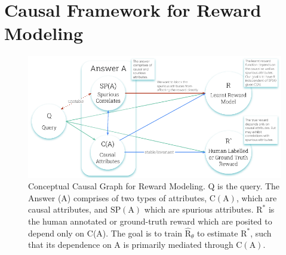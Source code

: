 
\section{Causal Framework for Reward Modeling}
\label{sec:preliminaries}


\vspace{-0.1in}
\begin{figure}[t!]
\centering
\includegraphics[width=0.7\linewidth]{images/CausalGraphA.pdf} 
\caption{Conceptual Causal Graph for Reward Modeling. $\mathrm{Q}$ is the query. The Answer (A) comprises of two types of attributes, $\mathrm{C}(\mathrm{A})$, which are causal attributes, and $\mathrm{SP}(\mathrm{A})$ which are spurious attributes. $\mathrm{R}^*$ is the human annotated or ground-truth reward which are posited to depend only on C(A). The goal is to train $\hat{\mathrm{R}}_\theta$ to estimate $\mathrm{R}^*$, such that its dependence on $\mathrm{A}$ is primarily mediated through $\mathrm{C}(\mathrm{A})$. \vspace{-0.2in}}
\label{fig:causal_graph}
\end{figure}


